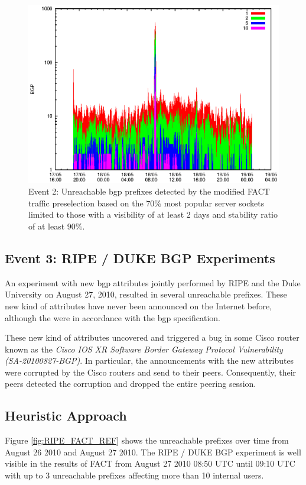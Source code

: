\begin{figure}
	[p] \centering 
	\includegraphics[width=0.75\linewidth]{images/events/2010_05_18/bgp_log_Set_var_0_1_stab_9_vts_2.eps} \caption{Event 2: Unreachable \gls{bgp} prefixes detected by the modified \gls{FACT} traffic preselection based on the $70\%$ most popular \glspl{server socket} limited to those with a visibility of at least 2 days and stability ratio of at least $90\%$.} 
	\label{fig:TIER1_FACT_popularVTS2STAB9} 
\end{figure}

\newpage 
\subsection{Event 3: RIPE / DUKE BGP Experiments}

An experiment with new \gls{bgp} attributes jointly performed by RIPE and the 
Duke University on August 27, 2010, resulted in several unreachable 
prefixes\citep{SchatzmannPAM2011}. These new kind of attributes have never been 
announced on the Internet before, although the were in accordance with the 
\gls{bgp} specification\citep{ripe_duke}.

These new kind of attributes uncovered and triggered a bug in some Cisco
router known as the \emph{Cisco IOS XR Software Border Gateway Protocol 
Vulnerability (SA-20100827-BGP)}\citep{cisco_vulnerability}. In particular, the 
announcements with the new attributes were corrupted by the Cisco routers and 
send to their peers. Consequently, their peers detected the corruption and 
dropped the entire peering session\citep{ripe_duke}.

\subsection{Heuristic Approach} 
Figure \ref{fig:RIPE_FACT_REF} shows the unreachable prefixes over time from 
August 26 2010 and August 27 2010. The RIPE / DUKE BGP experiment is well 
visible in the results of  \gls{FACT} from August 27 2010 08:50 UTC until 09:10 
UTC with up to 3 unreachable prefixes affecting more than 10 internal users. 

